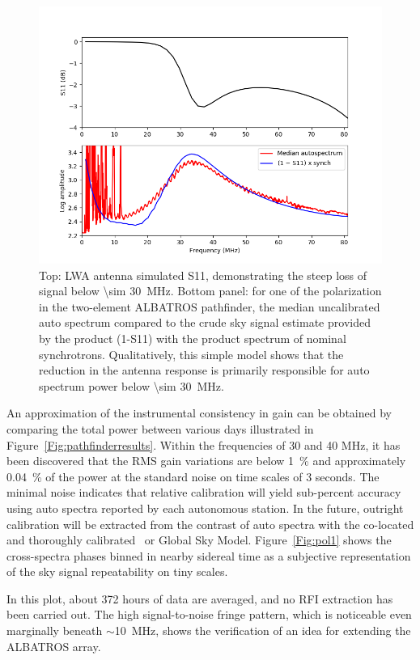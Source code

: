 \begin{figure}
	\centering
	\includegraphics[width=0.9\linewidth]{"Figures/s11 lwa"}
	\caption{Top: LWA antenna simulated S11, demonstrating the steep loss of signal below \SI{\sim 30}{\mega \hertz}. Bottom panel: for one of the polarization in the two-element ALBATROS pathfinder, the median uncalibrated auto spectrum compared to the crude sky signal estimate provided by the product (1-S11) with the product spectrum of nominal synchrotrons. Qualitatively, this simple model shows that the reduction in the antenna response is primarily responsible for auto spectrum power below \SI{\sim 30}{\mega \hertz}.}
	\label{Fig:s11lwa}
\end{figure}

An approximation of the instrumental consistency in gain can be obtained by comparing the total power between various days illustrated in Figure~\ref{Fig:pathfinderresults}. Within the frequencies of 30 and 40 MHz, it has been discovered that the RMS gain variations are below \SI{1}{\percent} and approximately \SI{0.04}{\percent} of the power at the standard noise on time scales of 3 seconds. The minimal noise indicates that relative calibration will yield sub-percent accuracy using auto spectra reported by each autonomous station. In the future, outright calibration will be extracted from the contrast of auto spectra with the co-located and thoroughly calibrated \prizm\ or Global Sky Model. Figure~\ref{Fig:pol1} shows the cross-spectra phases binned in nearby sidereal time as a subjective representation of the sky signal repeatability on tiny scales.

In this plot, about 372 hours of data are averaged, and no RFI extraction has been carried out. The high signal-to-noise fringe pattern, which is noticeable even marginally beneath $\sim$\SI{10}{\mega\hertz}, shows the verification of an idea for extending the ALBATROS array.

